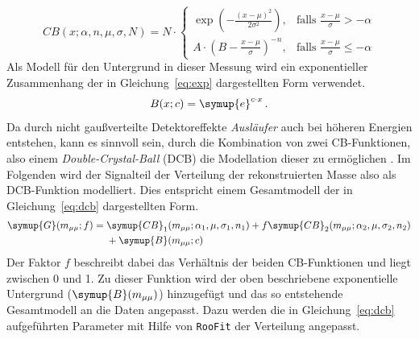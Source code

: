 %
\begin{equation}
  {\displaystyle CB(x;\alpha ,n,{\mu},\sigma,N)=N\cdot {\begin{cases}\exp \left(-{\frac {(x-{\mu})^{2}}{2\sigma ^{2}}}\right),&{\mbox{falls }}{\frac {x-{\mu}}{\sigma }}>-\alpha \\A\cdot \left(B-{\frac {x-{\mu}}{\sigma }}\right)^{-n},&{\mbox{falls }}{\frac {x-{\mu}}{\sigma }}\leqslant -\alpha \end{cases}}}
  \label{eq:cb}
\end{equation}
%
Als Modell für den Untergrund in dieser Messung wird ein exponentieller Zusammenhang der in Gleichung~\ref{eq:exp} dargestellten Form verwendet.
%
\begin{equation}
  B(x; c)= \symup{e}^{c\cdot x} \, .
  \label{eq:exp}
\end{equation}
%
Da durch nicht gaußverteilte Detektoreffekte \textit{Ausläufer} auch bei höheren Energien entstehen, kann es sinnvoll sein, durch die Kombination von zwei CB-Funktionen, also einem \textit{Double-Crystal-Ball} (DCB) die Modellation dieser zu ermöglichen \cite{ipatia}.
Im Folgenden wird der Signalteil der Verteilung der rekonstruierten Masse also als DCB-Funktion modelliert. Dies entspricht einem Gesamtmodell der in Gleichung~\ref{eq:dcb} dargestellten Form.
%
\begin{equation}
  \begin{split}
  \symup{G}(m_{\mu\mu}; f)={}&\symup{CB}_1(m_{\mu\mu};\alpha_1,\mu,\sigma_1,n_1) + f\symup{CB}_2(m_{\mu\mu};\alpha_2,\mu,\sigma_2,n_2)\\ &+ \symup{B}(m_{\mu\mu};c)
  \end{split}
  \label{eq:dcb}
\end{equation}
%
Der Faktor $f$ beschreibt dabei das Verhältnis der beiden CB-Funktionen und liegt zwischen 0 und 1. Zu dieser Funktion wird der oben beschriebene exponentielle Untergrund ($\symup{B}(m_{\mu\mu})$) hinzugefügt und das so entstehende Gesamtmodell an die Daten angepasst. Dazu werden die in Gleichung~\eqref{eq:dcb} aufgeführten Parameter mit Hilfe von \texttt{RooFit} der Verteilung angepasst.
%
%

